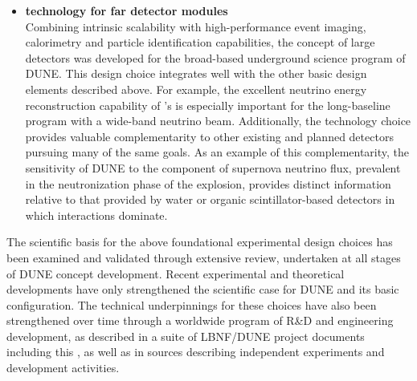 \begin{itemize}
  \item {\bf \lartpc technology for far detector modules}\\
    Combining intrinsic scalability with high-performance event 
    imaging, calorimetry and particle identification capabilities, 
    the concept of large  detectors was developed 
    for the broad-based underground science program of DUNE.  This design choice integrates well with the
    other basic design elements described above.
    For example, the
    excellent neutrino energy reconstruction capability
    of 's 
    is especially important for the long-baseline program with a 
    wide-band neutrino beam.
    Additionally, the  technology choice provides 
    valuable complementarity to other 
    existing and planned detectors pursuing many
    of the same goals.  As an example of this complementarity,
    the sensitivity of DUNE to the \nue component of supernova 
    neutrino flux, prevalent in the neutronization phase of the 
    explosion, provides distinct information relative to that 
    provided by water or organic scintillator-based detectors in 
    which \anue interactions dominate.  
\end{itemize}

The scientific basis for the above foundational experimental
design choices has been examined and validated through extensive
review, undertaken at all stages of DUNE concept development.
Recent experimental and theoretical developments have only
strengthened the scientific case for DUNE and its
basic configuration.  The technical underpinnings for
these choices have also been strengthened over time through a worldwide
program of R\&D and engineering development, as described in a suite
of LBNF/DUNE project documents including this , as
well as in sources describing independent experiments and development
activities.




